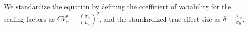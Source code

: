 We standardize the equation by defining the coefficient of variability for the scaling factors as $CV_{\alpha}^2 = ({\frac{\sigma_{\alpha}}{\mu_{\alpha}}})^2$, and the standardized true effect size as $\delta = \frac{\beta_{10}}{\sigma_0}$.